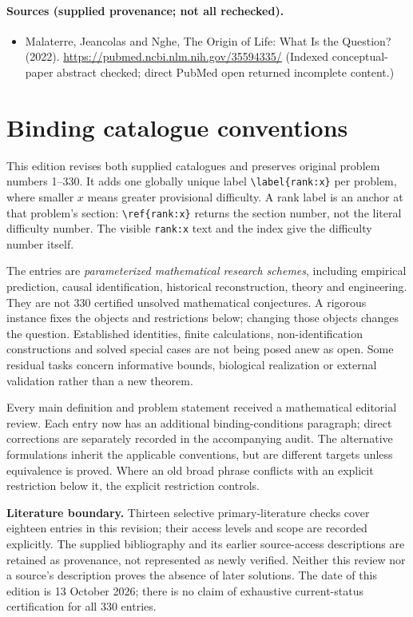 \documentclass[11pt]{article}
\begin{document}
\paragraph{Sources (supplied provenance; not all rechecked).} \begin{itemize}
\item Malaterre, Jeancolas and Nghe, The Origin of Life: What Is the Question? (2022). \url{https://pubmed.ncbi.nlm.nih.gov/35594335/} (Indexed conceptual-paper abstract checked; direct PubMed open returned incomplete content.)
\end{itemize}


\section*{Binding catalogue conventions}
This edition revises both supplied catalogues and preserves original problem numbers 1--330. It adds one globally unique label \verb|\label{rank:x}| per problem, where smaller $x$ means greater provisional difficulty. A rank label is an anchor at that problem's section: \verb|\ref{rank:x}| returns the section number, not the literal difficulty number. The visible \texttt{rank:x} text and the index give the difficulty number itself.

The entries are \emph{parameterized mathematical research schemes}, including empirical prediction, causal identification, historical reconstruction, theory and engineering. They are not 330 certified unsolved mathematical conjectures. A rigorous instance fixes the objects and restrictions below; changing those objects changes the question. Established identities, finite calculations, non-identification constructions and solved special cases are not being posed anew as open. Some residual tasks concern informative bounds, biological realization or external validation rather than a new theorem.

Every main definition and problem statement received a mathematical editorial review. Each entry now has an additional binding-conditions paragraph; direct corrections are separately recorded in the accompanying audit. The alternative formulations inherit the applicable conventions, but are different targets unless equivalence is proved. Where an old broad phrase conflicts with an explicit restriction below it, the explicit restriction controls.

\textbf{Literature boundary.} Thirteen selective primary-literature checks cover eighteen entries in this revision; their access levels and scope are recorded explicitly. The supplied bibliography and its earlier source-access descriptions are retained as provenance, not represented as newly verified. Neither this review nor a source's description proves the absence of later solutions. The date of this edition is 13 October 2026; there is no claim of exhaustive current-status certification for all 330 entries.
\end{document}
